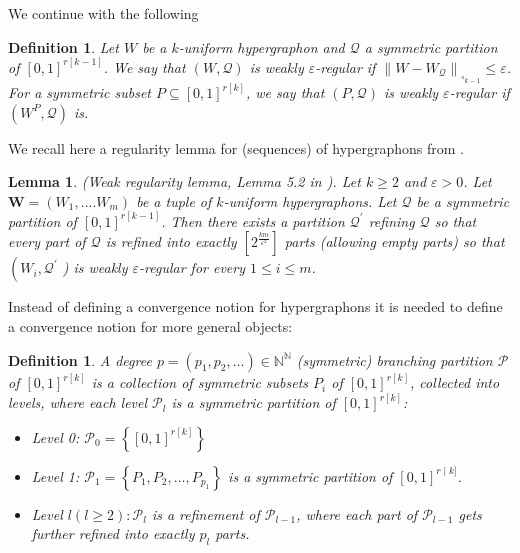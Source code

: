 \documentclass[11pt]{article}
\newtheorem{lemma}[theorem]{Lemma}
\newtheorem{definition}[theorem]{Definition}
\def\N{\mathbb{N}}
\begin{document}
 We continue with the following
\begin{definition}\label{RegulDef1}
Let $W$ be a $k$-uniform hypergraphon and $\mathcal{Q}$ a symmetric partition of $[0,1]^{r [ k-1]}$. We say that $(W, \mathcal{Q})$ is weakly $\varepsilon$-regular if $\left\|W-W_{\mathcal{Q}}\right\|_{\square_{k-1}} \leq \varepsilon$.
For a symmetric subset $P \subseteq[0,1]^{r [ k]}$, we say that $(P, \mathcal{Q})$ is weakly $\varepsilon$-regular if $\left(W^P, \mathcal{Q}\right)$ is.
\end{definition} 

We recall here a regularity lemma for (sequences) of  hypergraphons from \cite{HypergraphonsZhao}.

\begin{lemma}\label{RegLemmaHyp}
 (Weak regularity lemma, 
 Lemma 5.2 in \cite{HypergraphonsZhao}). Let $k \geq 2$ and $\varepsilon>0$. Let $\mathbf{W}=\left(W_1, \ldots . W_m\right)$ be a tuple of $k$-uniform hypergraphons. Let $\mathcal{Q}$ be a symmetric partition of $[0,1]^{r[k-1]}$. Then there exists a partition $\mathcal{Q}^{\prime}$ refining $\mathcal{Q}$ so that every part of $\mathcal{Q}$ is refined into exactly $\left[2^{\frac{km}{\varepsilon^2}}\right]$ parts (allowing empty parts) so that $\left(W_i, \mathcal{Q}^{\prime}\right.$ ) is weakly $\varepsilon$-regular for every $1 \leq i \leq m$.
\end{lemma}

Instead of defining a convergence notion for hypergraphons it is needed to define a convergence notion for more general objects: 

\begin{definition}
A degree $p=\left(p_1, p_2, \ldots \right ) \in \N^{\N}$ (symmetric) branching partition $\mathscr{P}$ of $[0,1]^{r[k]}$ is a collection of symmetric subsets $P_i$ of $[0,1]^{r[k]}$, collected into levels, where each level $\mathcal{P}_l$ is a symmetric partition of $[0,1]^{r[k]}$:
\begin{itemize}
\item Level 0: $\mathcal{P}_0=\left\{[0,1]^{r[k]}\right\}$
\item Level 1: $\mathcal{P}_1=\left\{P_1, P_2, \ldots, P_{p_1}\right\}$ is a symmetric partition of $[0,1]^{r \mid k]}$.
\item Level $l(l \geq 2): \mathcal{P}_l$ is a refinement of $\mathcal{P}_{l-1}$, where each part of $\mathcal{P}_{l-1}$ gets further refined into exactly $p_l$ parts.
\end{itemize}
\end{definition} 
\end{document}
